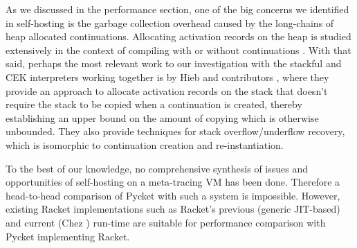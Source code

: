 As we discussed in the performance section, one of the big concerns we
identified in self-hosting is the garbage collection overhead caused
by the long-chains of heap allocated continuations. Allocating
activation records on the heap is studied extensively in the context
of compiling with \cite{comp-cont:07} or without
\cite{comp-without-cont:17} continuations \cite{whatever:19,
  compWithContLLVM:16}. With that said, perhaps the most relevant work
to our investigation with the stackful and CEK interpreters working
together is by Hieb and contributors \cite{cont-heap-stack:90}, where
they provide an approach to allocate activation records on the stack
that doesn't require the stack to be copied when a continuation is
created, thereby establishing an upper bound on the amount of copying
which is otherwise unbounded. They also provide techniques for stack
overflow/underflow recovery, which is isomorphic to continuation
creation and re-instantiation.

To the best of our knowledge, no comprehensive synthesis of issues and
opportunities of self-hosting on a meta-tracing VM has been
done. Therefore a head-to-head comparison of Pycket with such a system
is impossible. However, existing Racket implementations such as
Racket's previous (generic JIT-based) and current (Chez
\cite{racket-on-chez-19}) run-time are suitable for performance
comparison with Pycket implementing Racket.



